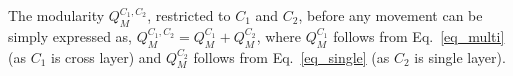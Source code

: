 

The modularity $Q_M^{C_1,C_2}$, restricted to $C_1$ and $C_2$, before any movement can be simply expressed as,
$Q_M^{C_1,C_2} = Q_M^{C_1}+ Q_M^{C_2}$,
where $Q_M^{C_1}$ follows from Eq.~\ref{eq_multi} (as $C_1$ is cross layer) and $Q_M^{C_2}$ follows from Eq.~\ref{eq_single}
(as $C_2$ is single layer).


